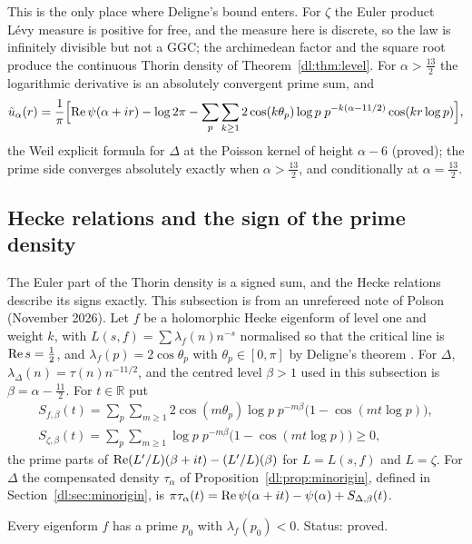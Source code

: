 This is the only place where Deligne's bound enters. For $\zeta$ the Euler product L\'evy measure is positive for free, and the measure here is discrete, so the law is infinitely divisible but not a GGC; the archimedean factor and the square root produce the continuous Thorin density of Theorem~\ref{dl:thm:level}. For $\alpha>\frac{13}2$ the logarithmic derivative is an absolutely convergent prime sum, and
\begin{equation}\label{dl:eq:primes}
\tilde u_\alpha(r)=\frac1\pi\Bigl[\operatorname{Re}\psi(\alpha+ir)-\log2\pi-\sum_p\sum_{k\ge1}2\cos(k\theta_p)\log p\;p^{-k(\alpha-11/2)}\cos(kr\log p)\Bigr],
\end{equation}
the Weil explicit formula for $\Delta$ at the Poisson kernel of height $\alpha-6$ (proved); the prime side converges absolutely exactly when $\alpha>\frac{13}2$, and conditionally at $\alpha=\frac{13}2$.

\subsection{Hecke relations and the sign of the prime density}\label{dl:sec:hecke}

The Euler part of the Thorin density is a signed sum, and the Hecke relations describe its signs exactly. This subsection is from an unrefereed note of Polson (November 2026). Let $f$ be a holomorphic Hecke eigenform of level one and weight $k$, with $L(s,f)=\sum\lambda_f(n)n^{-s}$ normalised so that the critical line is $\operatorname{Re} s=\frac12$, and $\lambda_f(p)=2\cos\theta_p$ with $\theta_p\in[0,\pi]$ by Deligne's theorem \cite{Deligne74}. For $\Delta$, $\lambda_\Delta(n)=\tau(n)n^{-11/2}$, and the centred level $\beta>1$ used in this subsection is $\beta=\alpha-\frac{11}2$. For $t\in\mathbb R$ put
\begin{gather*}
S_{f,\beta}(t)=\sum_p\sum_{m\ge1}2\cos(m\theta_p)\log p\;p^{-m\beta}\bigl(1-\cos(mt\log p)\bigr),\\
S_{\zeta,\beta}(t)=\sum_p\sum_{m\ge1}\log p\;p^{-m\beta}\bigl(1-\cos(mt\log p)\bigr)\ge0,
\end{gather*}
the prime parts of $\operatorname{Re}(L'/L)(\beta+it)-(L'/L)(\beta)$ for $L=L(s,f)$ and $L=\zeta$. For $\Delta$ the compensated density $\tau_\alpha$ of Proposition~\ref{dl:prop:minorigin}, defined in Section~\ref{dl:sec:minorigin}, is $\pi\tau_\alpha(t)=\operatorname{Re}\psi(\alpha+it)-\psi(\alpha)+S_{\Delta,\beta}(t)$.

\begin{lemma}\label{dl:lem:neg}
Every eigenform $f$ has a prime $p_0$ with $\lambda_f(p_0)<0$. Status: proved.
\end{lemma}

